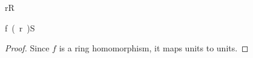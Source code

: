 \documentclass{article}
\begin{document}
\begin{theorem}\label{thm:unit_hom}
  \begin{assumptions}
    \item {}
    \item {}
    \item {}
    \item \unit{r}{R}
  \end{assumptions}
  \begin{conclusion}
    \unit{f(r)}{S}
  \end{conclusion}
\end{theorem}

\begin{proof}
  Since $f$ is a ring homomorphism, it maps units to units.
\end{proof}
\end{document}

